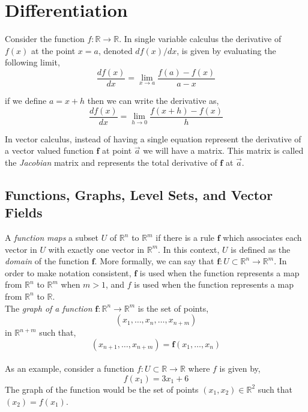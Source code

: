 \documentclass[12pt]{article}
\begin{document}
\pagebreak
\section{Differentiation}

Consider the function $f:\mathbb{R}\rightarrow\mathbb{R}$. In single variable calculus the derivative of $f(x)$ at the point $x=a$, denoted $df(x)/dx$, is given by evaluating the following limit,
\[
\frac{df(x)}{dx}=\lim_{x\rightarrow a}\frac{f(a)-f(x)}{a-x}
\]

 if we define $a = x + h$ then we can write the derivative as,
\[
\frac{df(x)}{dx}=\lim_{h\rightarrow 0}\frac{f(x+h)-f(x)}{h}
\]

 In vector calculus, instead of having a single equation represent the derivative of a vector valued function $\mathbf{f}$ at point $\vec{a}$ we will have a matrix. This matrix is called the \emph{Jacobian} matrix and represents the total derivative of $\mathbf{f}$ at $\vec{a}$. \\ 

\subsection{Functions, Graphs, Level Sets, and Vector Fields}

 A \emph{function} \emph{maps} a subset $U$ of $\mathbb{R}^n$ to $\mathbb{R}^m$ if there is a rule $\mathbf{f}$ which associates each vector in $U$ with exactly one vector in $\mathbb{R}^m$. In this context, $U$ is defined as the \emph{domain} of the function $\mathbf{f}$. More formally, we can say that $\mathbf{f}:U\subset\mathbb{R}^n\rightarrow\mathbb{R}^m$. In order to make notation consistent, $\mathbf{f}$ is used when the function represents a map from $\mathbb{R}^n$ to $\mathbb{R}^m$ when $m>1$, and $f$ is used when the function represents a map from $\mathbb{R}^n$ to $\mathbb{R}$. \\
 
 The \emph{graph of a function} $\mathbf{f}:\mathbb{R}^n\rightarrow\mathbb{R}^m$ is the set of points,
 \[
 (x_1, \ldots, x_{n},\ldots,x_{n+m})
 \]
 in $\mathbb{R}^{n+m}$ such that,
 \[
 (x_{n+1},\ldots,x_{n+m}) = \mathbf{f}(x_1, \ldots, x_n)
 \] \\
 
 As an example, consider a function $f:U\subset\mathbb{R}\rightarrow\mathbb{R}$ where $f$ is given by,
 \[
 f(x_1) = 3x_1 + 6  
 \]
  The graph of the function would be the set of points $(x_1,x_2)\in\mathbb{R}^2$ such that $(x_2) = f(x_1)$. \\
 
\end{document}
